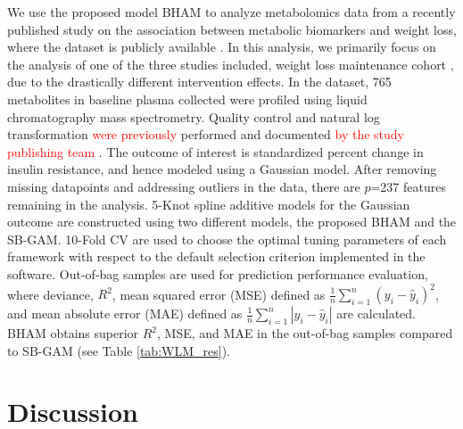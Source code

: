 \documentclass[AMA,STIX1COL,]{WileyNJD-v2}
\begin{document}
We use the proposed model BHAM to analyze metabolomics data from a
recently published study \citep{Bihlmeyer2021} on the association
between metabolic biomarkers and weight loss, where the dataset is
publicly available \citep{Bihlmeyer2021_data}. In this analysis, we
primarily focus on the analysis of one of the three studies included,
weight loss maintenance cohort \citep{Svetkey2008}, due to the
drastically different intervention effects. In the dataset, 765
metabolites in baseline plasma collected were profiled using liquid
chromatography mass spectrometry. Quality control and natural log
transformation \textcolor{red}{were previously} performed and documented
\textcolor{red}{by the study publishing team \cite{Bihlmeyer2021}}. The
outcome of interest is standardized percent change in insulin
resistance, and hence modeled using a Gaussian model. After removing
missing datapoints and addressing outliers in the data, there are
\(p\)=237 features remaining in the analysis. 5-Knot spline additive
models for the Gaussian outcome are constructed using two different
models, the proposed BHAM and the SB-GAM. 10-Fold CV are used to choose
the optimal tuning parameters of each framework with respect to the
default selection criterion implemented in the software. Out-of-bag
samples are used for prediction performance evaluation, where deviance,
\(R^2\), mean squared error (MSE) defined as
\(\frac{1}{n}\sum\limits^{n}_{i=1}(y_i - \hat y_i)^2\), and mean
absolute error (MAE) defined as
\(\frac{1}{n}\sum\limits^{n}_{i=1}|y_i - \hat y_i|\) are calculated.
BHAM obtains superior \(R^2\), MSE, and MAE in the out-of-bag samples
compared to SB-GAM (see Table \ref{tab:WLM_res}).

\section{Discussion}
\label{sec:concl}
\end{document}
